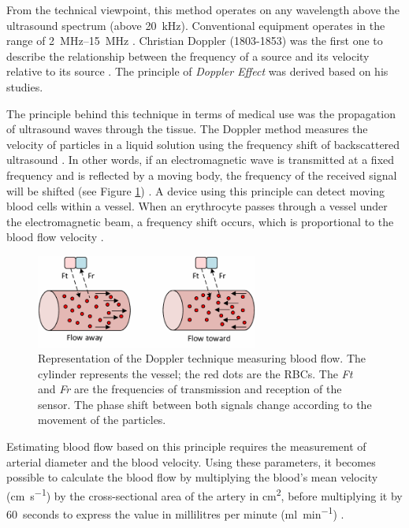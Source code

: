 From the technical viewpoint, this method operates on any wavelength above the ultrasound spectrum (above \SI{20}{\kilo\hertz}). Conventional equipment operates in the range of \SIrange{2}{15}{\mega\hertz} \cite{jayanthy2011measuring}. Christian Doppler (1803-1853) was the first one to describe the relationship between the frequency of a source and its velocity relative to its source \cite{surgeonhand2002Hand}. The principle of \textit{Doppler Effect} was derived based on his studies. 

The principle behind this technique in terms of medical use was the propagation of ultrasound waves through the tissue. The Doppler method measures the velocity of particles in a liquid solution using the frequency shift of backscattered ultrasound \cite{orekhova2013doppler, nichols2011mcdonald}. In other words, if an electromagnetic wave is transmitted at a fixed frequency and is reflected by a moving body, the frequency of the received signal will be shifted (see Figure \ref{fig:Doppler method}) \cite{casey2008measuring,jayanthy2011measuring, surgeonhand2002Hand,ht:MD2}. A device using this principle can detect moving blood cells within a vessel. When an erythrocyte passes through a vessel under the electromagnetic beam, a frequency shift occurs, which is proportional to the blood flow velocity \cite{gill1979pulsed}.

\begin{figure}[!htpb]
	\centering
	\includegraphics[width=0.65\textwidth,keepaspectratio]{figure5}    
	\caption[Doppler technique to measure flow]{Representation of the Doppler technique measuring blood flow. The cylinder represents the vessel; the red dots are the RBCs. The \textit{Ft} and \textit{Fr} are the frequencies of transmission and reception of the sensor. The phase shift between both signals change according to the movement of the particles.}
	\label{fig:Doppler method}
\end{figure}

Estimating blood flow based on this principle requires the measurement of arterial diameter and the blood velocity. Using these parameters, it becomes possible to calculate the blood flow by multiplying the blood's mean velocity (\si{\cm \per \second}) by the cross-sectional area of the artery in \si{\square \cm}, before multiplying it by \SI{60}{seconds} to express the value in millilitres per minute (\si{\milli\litre\per\minute}) \cite{casey2008measuring}. 

